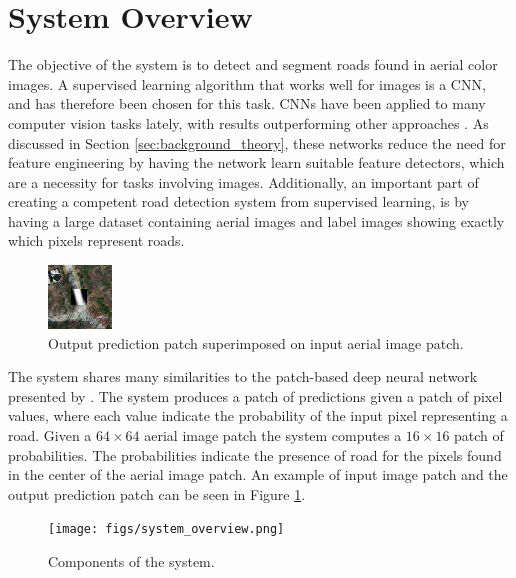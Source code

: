 \section{System Overview}
\label{sec:systemOverview}



The objective of the system is to detect and segment roads found in aerial color images. A supervised learning algorithm that works well for images is a \ac{CNN}, and has therefore been chosen for this task. \ac{CNN}s have been applied to many computer vision tasks lately, with results outperforming other approaches \citep{Krizhevsky_imagenet}. As discussed in Section \ref{sec:background_theory}, these networks reduce the need for feature engineering by having the network learn suitable feature detectors, which are a necessity for tasks involving images. Additionally, an important part of creating a competent road detection system from supervised learning, is by having a large dataset containing aerial images and label images showing exactly which pixels represent roads.\\

\begin{figure}[t]
\begin{center}
\includegraphics[width=0.15\columnwidth]{figs/labeloverlay.png}
\caption[Input patch and prediction]{Output prediction patch superimposed on input aerial image patch.}
\label{fig:system_data_patch}
\end{center}
\end{figure}

The system shares many similarities to the patch-based deep neural network presented by \cite{Mnih_aerial_images_noisy}. The system produces a patch of predictions given a patch of pixel values, where each value indicate the probability of the input pixel representing a road. Given a $64 \times 64$ aerial image patch the system computes a $16 \times 16$ patch of probabilities. The probabilities indicate the presence of road for the pixels found in the center of the aerial image patch. An example of input image patch and the output prediction patch can be seen in Figure \ref{fig:system_data_patch}.  \\

\begin{figure}[t]
\begin{center}
\texttt{[image: figs/system\_overview.png]}
\caption[Components of the system]{Components of the system.}
\label{fig:system_components}
\end{center}
\end{figure}

